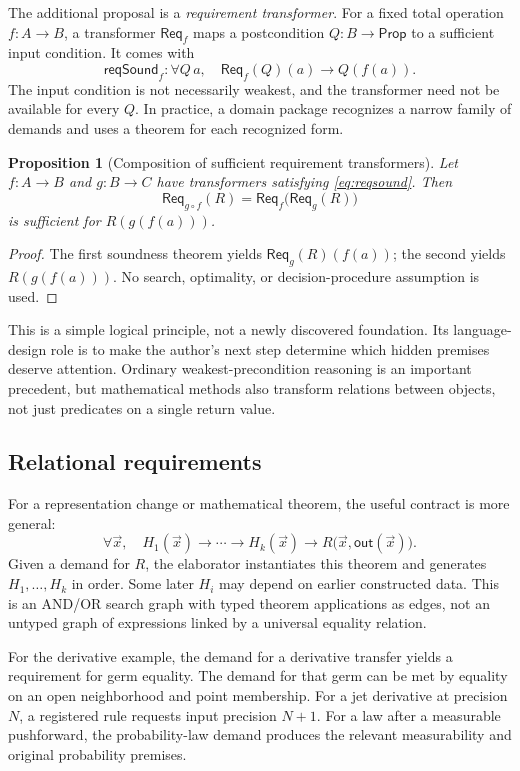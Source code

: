 \documentclass[11pt,a4paper]{article}
\newcommand{\Prop}{\mathsf{Prop}}
\newcommand{\Req}{\mathsf{Req}}
\newtheorem{proposition}[theorem]{Proposition}
\theoremstyle{definition}
\begin{document}
The additional proposal is a \emph{requirement transformer}. For a fixed total
operation $f:A\to B$, a transformer $\Req_f$ maps a postcondition $Q:B\to\Prop$
to a sufficient input condition. It comes with
\begin{equation}\label{eq:reqsound}
 \mathsf{reqSound}_f:\forall Q\,a,\quad
 \Req_f(Q)(a)\longrightarrow Q(f(a)).
\end{equation}
The input condition is not necessarily weakest, and the transformer need not
be available for every $Q$. In practice, a domain package recognizes a narrow
family of demands and uses a theorem for each recognized form.

\begin{proposition}[Composition of sufficient requirement transformers]
Let $f:A\to B$ and $g:B\to C$ have transformers satisfying
\eqref{eq:reqsound}. Then
\[
 \Req_{g\circ f}(R)=\Req_f\bigl(\Req_g(R)\bigr)
\]
is sufficient for $R(g(f(a)))$.
\end{proposition}
\begin{proof}
The first soundness theorem yields $\Req_g(R)(f(a))$; the second yields
$R(g(f(a)))$. No search, optimality, or decision-procedure assumption is used.
\end{proof}

This is a simple logical principle, not a newly discovered foundation. Its
language-design role is to make the author's next step determine which hidden
premises deserve attention. Ordinary weakest-precondition reasoning is an
important precedent, but mathematical methods also transform relations between
objects, not just predicates on a single return value.

\subsection{Relational requirements}
For a representation change or mathematical theorem, the useful contract is
more general:
\[
 \forall \vec x,\quad H_1(\vec x)\to\cdots\to H_k(\vec x)
              \to R\bigl(\vec x,\mathsf{out}(\vec x)\bigr).
\]
Given a demand for $R$, the elaborator instantiates this theorem and generates
$H_1,\ldots,H_k$ in order. Some later $H_i$ may depend on earlier constructed
data. This is an AND/OR search graph with typed theorem applications as edges,
not an untyped graph of expressions linked by a universal equality relation.

For the derivative example, the demand for a derivative transfer yields a
requirement for germ equality. The demand for that germ can be met by equality
on an open neighborhood and point membership. For a jet derivative at precision
$N$, a registered rule requests input precision $N+1$. For a law after a
measurable pushforward, the probability-law demand produces the relevant
measurability and original probability premises.
\end{document}

